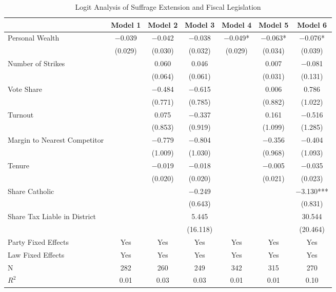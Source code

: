 \begin{table}

\caption{\label{tab:logit_suffrage_fiscal}Logit Analysis of Suffrage Extension and Fiscal Legislation}
\centering
\begin{tabular}[t]{lcccccc}
\toprule
  & Model 1 & Model 2 & Model 3 & Model 4 & Model 5 & Model 6\\
\midrule
Personal Wealth & \num{-0.039} & \num{-0.042} & \num{-0.038} & \num{-0.049}* & \num{-0.063}* & \num{-0.076}*\\
 & (\num{0.029}) & (\num{0.030}) & (\num{0.032}) & (\num{0.029}) & (\num{0.034}) & (\num{0.039})\\
Number of Strikes &  & \num{0.060} & \num{0.046} &  & \num{0.007} & \num{-0.081}\\
 &  & (\num{0.064}) & (\num{0.061}) &  & (\num{0.031}) & (\num{0.131})\\
Vote Share &  & \num{-0.484} & \num{-0.615} &  & \num{0.006} & \num{0.786}\\
 &  & (\num{0.771}) & (\num{0.785}) &  & (\num{0.882}) & (\num{1.022})\\
Turnout &  & \num{0.075} & \num{-0.337} &  & \num{0.161} & \num{-0.516}\\
 &  & (\num{0.853}) & (\num{0.919}) &  & (\num{1.099}) & (\num{1.285})\\
Margin to Nearest Competitor &  & \num{-0.779} & \num{-0.804} &  & \num{-0.356} & \num{-0.404}\\
 &  & (\num{1.009}) & (\num{1.030}) &  & (\num{0.968}) & (\num{1.093})\\
Tenure &  & \num{-0.019} & \num{-0.018} &  & \num{-0.005} & \num{-0.035}\\
 &  & (\num{0.020}) & (\num{0.020}) &  & (\num{0.021}) & (\num{0.023})\\
Share Catholic &  &  & \num{-0.249} &  &  & \num{-3.130}***\\
 &  &  & (\num{0.643}) &  &  & (\num{0.831})\\
Share Tax Liable in District &  &  & \num{5.445} &  &  & \num{30.544}\\
 &  &  & (\num{16.118}) &  &  & (\num{20.464})\\
\midrule
Party Fixed Effects & Yes & Yes & Yes & Yes & Yes & Yes\\
Law Fixed Effects & Yes & Yes & Yes & Yes & Yes & Yes\\
N & \num{282} & \num{260} & \num{249} & \num{342} & \num{315} & \num{270}\\
$R^2$ & \num{0.01} & \num{0.03} & \num{0.03} & \num{0.01} & \num{0.01} & \num{0.10}\\

\end{tabular}
\end{table}
